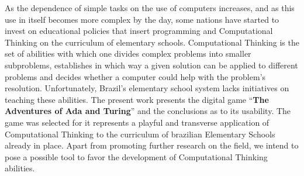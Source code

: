 As the dependence of simple tasks on the use of computers increases, and as this use in itself becomes more complex by the day, some nations have started to invest on educational policies that insert programming and Computational Thinking on the curriculum of elementary schools. Computational Thinking is the set of abilities with which one divides complex problems into smaller subproblems, establishes in which way a given solution can be applied to different problems and decides whether a computer could help with the problem’s resolution. Unfortunately, Brazil’s elementary school system lacks initiatives on teaching these abilities. The present work presents the digital game “\textbf{The Adventures of Ada and Turing}” and the conclusions as to its usability. The game was selected for it represents a playful and transverse application of Computational Thinking to the curriculum of brazilian Elementary Schools already in place. Apart from promoting further research on the field, we intend to pose a possible tool to favor the development of Computational Thinking abilities.